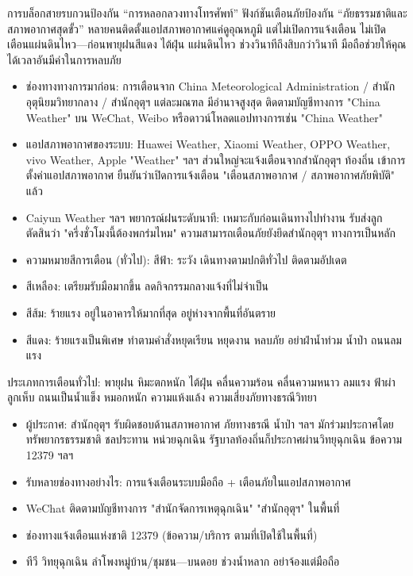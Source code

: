 
การบล็อกสายรบกวนป้องกัน “การหลอกลวงทางโทรศัพท์” ฟังก์ชันเตือนภัยป้องกัน “ภัยธรรมชาติและสภาพอากาศสุดขั้ว” หลายคนติดตั้งแอปสภาพอากาศแค่ดูอุณหภูมิ แต่ไม่เปิดการแจ้งเตือน ไม่เปิดเตือนแผ่นดินไหว—ก่อนพายุฝนสีแดง ไต้ฝุ่น แผ่นดินไหว ช่วงวินาทีถึงสิบกว่าวินาที มือถือช่วยให้คุณได้เวลาอันมีค่าในการหลบภัย


\begin{itemize}
  \item ช่องทางทางการมาก่อน: การเตือนจาก China Meteorological Administration / สำนักอุตุนิยมวิทยากลาง / สำนักอุตุฯ แต่ละมณฑล มีอำนาจสูงสุด ติดตามบัญชีทางการ "China Weather" บน WeChat, Weibo หรือดาวน์โหลดแอปทางการเช่น "China Weather"
  \item แอปสภาพอากาศของระบบ: Huawei Weather, Xiaomi Weather, OPPO Weather, vivo Weather, Apple "Weather" ฯลฯ ส่วนใหญ่จะแจ้งเตือนจากสำนักอุตุฯ ท้องถิ่น เข้าการตั้งค่าแอปสภาพอากาศ ยืนยันว่าเปิดการแจ้งเตือน "เตือนสภาพอากาศ / สภาพอากาศภัยพิบัติ" แล้ว
  \item Caiyun Weather ฯลฯ พยากรณ์ฝนระดับนาที: เหมาะกับก่อนเดินทางไปทำงาน รับส่งลูก ตัดสินว่า "ครึ่งชั่วโมงนี้ต้องพกร่มไหม" ความสามารถเตือนภัยยังยึดสำนักอุตุฯ ทางการเป็นหลัก
  \item ความหมายสีการเตือน (ทั่วไป): สีฟ้า: ระวัง เดินทางตามปกติทั่วไป ติดตามอัปเดต
  \item สีเหลือง: เตรียมรับมือมากขึ้น ลดกิจกรรมกลางแจ้งที่ไม่จำเป็น
  \item สีส้ม: ร้ายแรง อยู่ในอาคารให้มากที่สุด อยู่ห่างจากพื้นที่อันตราย
  \item สีแดง: ร้ายแรงเป็นพิเศษ ทำตามคำสั่งหยุดเรียน หยุดงาน หลบภัย อย่าฝ่าน้ำท่วม น้ำป่า ถนนลมแรง
\end{itemize}

ประเภทการเตือนทั่วไป: พายุฝน หิมะตกหนัก ไต้ฝุ่น คลื่นความร้อน คลื่นความหนาว ลมแรง ฟ้าผ่า ลูกเห็บ ถนนเป็นน้ำแข็ง หมอกหนัก ความแห้งแล้ง ความเสี่ยงภัยทางธรณีวิทยา


\begin{itemize}
  \item ผู้ประกาศ: สำนักอุตุฯ รับผิดชอบด้านสภาพอากาศ ภัยทางธรณี น้ำป่า ฯลฯ มักร่วมประกาศโดยทรัพยากรธรรมชาติ ชลประทาน หน่วยฉุกเฉิน รัฐบาลท้องถิ่นก็ประกาศผ่านวิทยุฉุกเฉิน ข้อความ 12379 ฯลฯ
  \item รับหลายช่องทางอย่างไร: การแจ้งเตือนระบบมือถือ + เตือนภัยในแอปสภาพอากาศ
  \item WeChat ติดตามบัญชีทางการ "สำนักจัดการเหตุฉุกเฉิน" "สำนักอุตุฯ" ในพื้นที่
  \item ช่องทางแจ้งเตือนแห่งชาติ 12379 (ข้อความ/บริการ ตามที่เปิดใช้ในพื้นที่)
  \item ทีวี วิทยุฉุกเฉิน ลำโพงหมู่บ้าน/ชุมชน—บนดอย ช่วงน้ำหลาก อย่าจ้องแต่มือถือ
\end{itemize}

